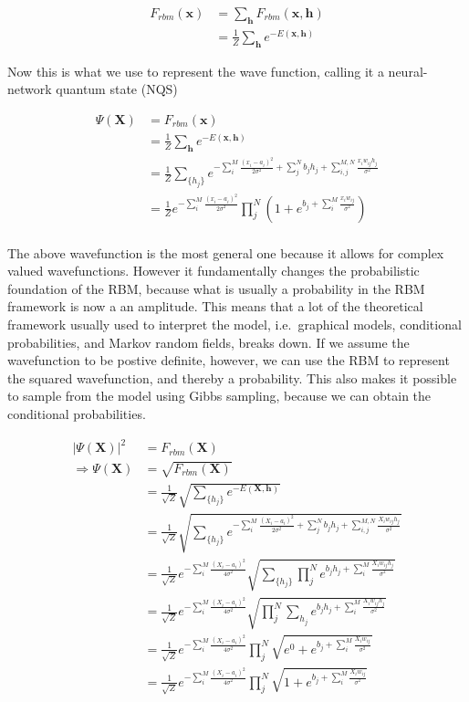 \documentclass[%
oneside,                 %
final,                   %
10pt]{article}
\begin{document}
\begin{align}
	F_{rbm}(\mathbf{x}) &= \sum_\mathbf{h} F_{rbm}(\mathbf{x}, \mathbf{h}) \\
				&= \frac{1}{Z}\sum_\mathbf{h} e^{-E(\mathbf{x}, \mathbf{h})}
\end{align}

Now this is what we use to represent the wave function, calling it a neural-network quantum state (NQS)

\begin{align}
	\Psi (\mathbf{X}) &= F_{rbm}(\mathbf{x}) \\
	&= \frac{1}{Z}\sum_{\bm{h}} e^{-E(\mathbf{x}, \mathbf{h})} \\
	&= \frac{1}{Z} \sum_{\{h_j\}} e^{-\sum_i^M \frac{(x_i - a_i)^2}{2\sigma^2} + \sum_j^N b_j h_j + \sum_{i,j}^{M,N} \frac{x_i w_{ij} h_j}{\sigma^2}} \\
	&= \frac{1}{Z} e^{-\sum_i^M \frac{(x_i - a_i)^2}{2\sigma^2}} \prod_j^N (1 + e^{b_j + \sum_i^M \frac{x_i w_{ij}}{\sigma^2}}) \\
\end{align}

The above wavefunction is the most general one because it allows for
complex valued wavefunctions. However it fundamentally changes the
probabilistic foundation of the RBM, because what is usually a
probability in the RBM framework is now a an amplitude. This means
that a lot of the theoretical framework usually used to interpret the
model, i.e.~graphical models, conditional probabilities, and Markov
random fields, breaks down. If we assume the wavefunction to be
postive definite, however, we can use the RBM to represent the squared
wavefunction, and thereby a probability. This also makes it possible
to sample from the model using Gibbs sampling, because we can obtain
the conditional probabilities.

\begin{align}
	|\Psi (\mathbf{X})|^2 &= F_{rbm}(\mathbf{X}) \\
	\Rightarrow \Psi (\mathbf{X}) &= \sqrt{F_{rbm}(\mathbf{X})} \\
	&= \frac{1}{\sqrt{Z}}\sqrt{\sum_{\{h_j\}} e^{-E(\mathbf{X}, \mathbf{h})}} \\
	&= \frac{1}{\sqrt{Z}} \sqrt{\sum_{\{h_j\}} e^{-\sum_i^M \frac{(X_i - a_i)^2}{2\sigma^2} + \sum_j^N b_j h_j + \sum_{i,j}^{M,N} \frac{X_i w_{ij} h_j}{\sigma^2}} }\\
	&= \frac{1}{\sqrt{Z}} e^{-\sum_i^M \frac{(X_i - a_i)^2}{4\sigma^2}} \sqrt{\sum_{\{h_j\}} \prod_j^N e^{b_j h_j + \sum_i^M \frac{X_i w_{ij} h_j}{\sigma^2}}} \\
	&= \frac{1}{\sqrt{Z}} e^{-\sum_i^M \frac{(X_i - a_i)^2}{4\sigma^2}} \sqrt{\prod_j^N \sum_{h_j}  e^{b_j h_j + \sum_i^M \frac{X_i w_{ij} h_j}{\sigma^2}}} \\
	&= \frac{1}{\sqrt{Z}} e^{-\sum_i^M \frac{(X_i - a_i)^2}{4\sigma^2}} \prod_j^N \sqrt{e^0 + e^{b_j + \sum_i^M \frac{X_i w_{ij}}{\sigma^2}}} \\
	&= \frac{1}{\sqrt{Z}} e^{-\sum_i^M \frac{(X_i - a_i)^2}{4\sigma^2}} \prod_j^N \sqrt{1 + e^{b_j + \sum_i^M \frac{X_i w_{ij}}{\sigma^2}}} \\
\end{align}
\end{document}
